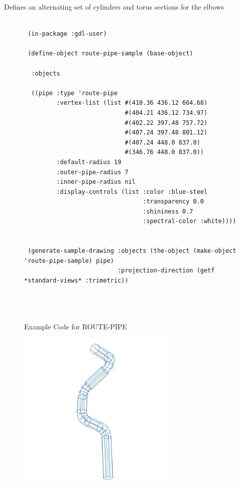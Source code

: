 \documentclass [11pt]{book}
\begin{document}
\begin{itemize}
\begin{description}
Defines an alternating set of cylinders and torus sections for the elbows



\end{description}




\begin{figure}
\begin{lrbox}{\boxedverb}
\begin{minipage}{\linewidth}
{\small

\begin{verbatim}

 (in-package :gdl-user)  

 (define-object route-pipe-sample (base-object)

  :objects

  ((pipe :type 'route-pipe
         :vertex-list (list #(410.36 436.12 664.68) 
                            #(404.21 436.12 734.97) 
                            #(402.22 397.48 757.72) 
                            #(407.24 397.48 801.12) 
                            #(407.24 448.0 837.0)
                            #(346.76 448.0 837.0))
         :default-radius 19
         :outer-pipe-radius 7
         :inner-pipe-radius nil
         :display-controls (list :color :blue-steel 
                                 :transparency 0.0 
                                 :shininess 0.7 
                                 :spectral-color :white))))

 
 (generate-sample-drawing :objects (the-object (make-object 'route-pipe-sample) pipe)
                          :projection-direction (getf *standard-views* :trimetric))
  



\end{verbatim}}
\end{minipage}
\end{lrbox}
\fbox{\usebox{\boxedverb}}

\caption{Example Code for ROUTE-PIPE}

\label{fig:example-code-ROUTE-PIPE}

\end{figure}

\begin{figure}
\begin{center}
\includegraphics[width=3in,height=3in]{../images/example-route-pipe.pdf}
\end{center}


\end{figure}
\end{itemize}
\end{document}
